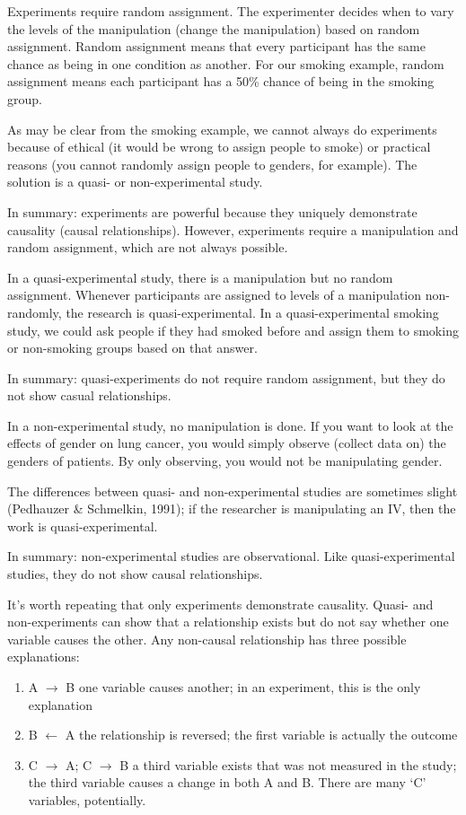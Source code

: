 \documentclass[
]{book}
\providecommand{\tightlist}{%
  \setlength{\itemsep}{0pt}\setlength{\parskip}{0pt}}
\begin{document}
Experiments require random assignment. The experimenter decides when to vary the levels of the manipulation (change the manipulation) based on random assignment. Random assignment means that every participant has the same chance as being in one condition as another. For our smoking example, random assignment means each participant has a 50\% chance of being in the smoking group.

As may be clear from the smoking example, we cannot always do experiments because of ethical (it would be wrong to assign people to smoke) or practical reasons (you cannot randomly assign people to genders, for example). The solution is a quasi- or non-experimental study.

In summary: experiments are powerful because they uniquely demonstrate causality (causal relationships). However, experiments require a manipulation and random assignment, which are not always possible.

In a quasi-experimental study, there is a manipulation but no random assignment. Whenever participants are assigned to levels of a manipulation non-randomly, the research is quasi-experimental. In a quasi-experimental smoking study, we could ask people if they had smoked before and assign them to smoking or non-smoking groups based on that answer.

In summary: quasi-experiments do not require random assignment, but they do not show casual relationships.

In a non-experimental study, no manipulation is done. If you want to look at the effects of gender on lung cancer, you would simply observe (collect data on) the genders of patients. By only observing, you would not be manipulating gender.

The differences between quasi- and non-experimental studies are sometimes slight (Pedhauzer \& Schmelkin, 1991); if the researcher is manipulating an IV, then the work is quasi-experimental.

In summary: non-experimental studies are observational. Like quasi-experimental studies, they do not show causal relationships.

It's worth repeating that only experiments demonstrate causality. Quasi- and non-experiments can show that a relationship exists but do not say whether one variable causes the other. Any non-causal relationship has three possible explanations:

\begin{enumerate}
\def\labelenumi{\arabic{enumi}.}
\tightlist
\item
  A \(\rightarrow\) B one variable causes another; in an experiment, this is the only explanation
\item
  B \(\leftarrow\) A the relationship is reversed; the first variable is actually the outcome
\item
  C \(\rightarrow\) A; C \(\rightarrow\) B a third variable exists that was not measured in the study; the third variable causes a change in both A and B. There are many `C' variables, potentially.
\end{enumerate}
\end{document}
